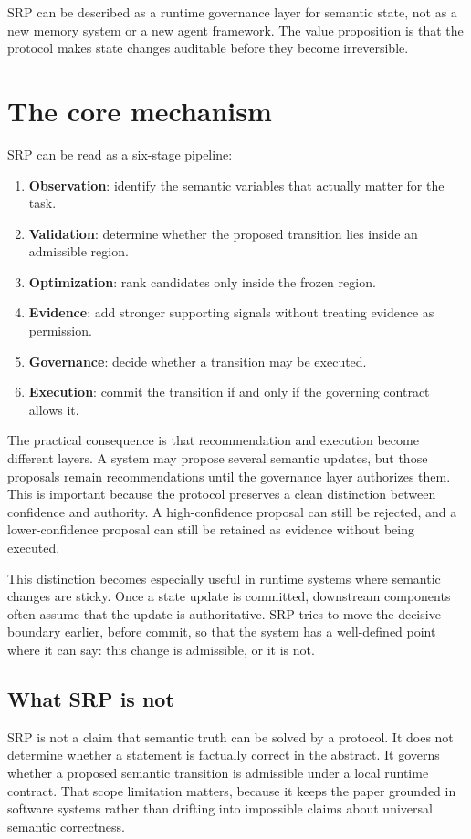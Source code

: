 \documentclass[10pt]{article}
\begin{document}
SRP can be described as a runtime governance layer for semantic state, not as a new memory system or a new agent framework. The value proposition is that the protocol makes state changes auditable before they become irreversible.

\section{The core mechanism}
SRP can be read as a six-stage pipeline:

\begin{enumerate}
  \item \textbf{Observation}: identify the semantic variables that actually matter for the task.
  \item \textbf{Validation}: determine whether the proposed transition lies inside an admissible region.
  \item \textbf{Optimization}: rank candidates only inside the frozen region.
  \item \textbf{Evidence}: add stronger supporting signals without treating evidence as permission.
  \item \textbf{Governance}: decide whether a transition may be executed.
  \item \textbf{Execution}: commit the transition if and only if the governing contract allows it.
\end{enumerate}

The practical consequence is that recommendation and execution become different layers. A system may propose several semantic updates, but those proposals remain recommendations until the governance layer authorizes them. This is important because the protocol preserves a clean distinction between confidence and authority. A high-confidence proposal can still be rejected, and a lower-confidence proposal can still be retained as evidence without being executed.

This distinction becomes especially useful in runtime systems where semantic changes are sticky. Once a state update is committed, downstream components often assume that the update is authoritative. SRP tries to move the decisive boundary earlier, before commit, so that the system has a well-defined point where it can say: this change is admissible, or it is not.

\subsection*{What SRP is not}
SRP is not a claim that semantic truth can be solved by a protocol. It does not determine whether a statement is factually correct in the abstract. It governs whether a proposed semantic transition is admissible under a local runtime contract. That scope limitation matters, because it keeps the paper grounded in software systems rather than drifting into impossible claims about universal semantic correctness.
\end{document}

